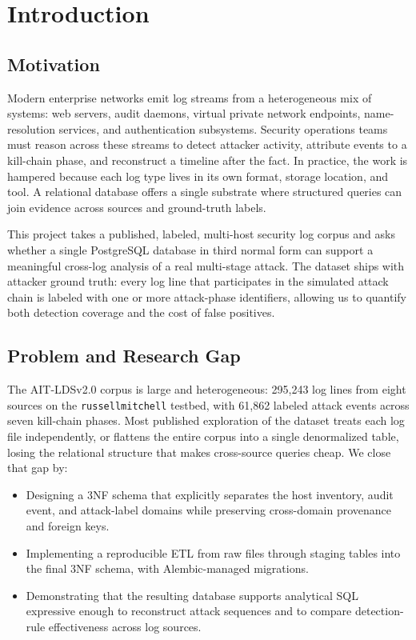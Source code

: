 \section{Introduction}
\label{sec:introduction}

\subsection{Motivation}
Modern enterprise networks emit log streams from a heterogeneous mix of
systems: web servers, audit daemons, virtual private network endpoints,
name-resolution services, and authentication subsystems. Security
operations teams must reason across these streams to detect attacker
activity, attribute events to a kill-chain phase, and reconstruct a
timeline after the fact. In practice, the work is hampered because
each log type lives in its own format, storage location, and tool. A
relational database offers a single substrate where structured queries
can join evidence across sources and ground-truth labels.

This project takes a published, labeled, multi-host security log corpus
\cite{landauer2022maintainable, ait2024dataset} and asks whether a
single PostgreSQL database in third normal form can support a
meaningful cross-log analysis of a real multi-stage attack. The dataset
ships with attacker ground truth: every log line that participates in
the simulated attack chain is labeled with one or more attack-phase
identifiers, allowing us to quantify both detection coverage and the
cost of false positives.

\subsection{Problem and Research Gap}
The AIT-LDSv2.0 corpus is large and heterogeneous: 295{,}243 log lines
from eight sources on the \texttt{russellmitchell} testbed, with
61{,}862 labeled attack events across seven kill-chain phases. Most
published exploration of the dataset treats each log file
independently, or flattens the entire corpus into a single denormalized
table, losing the relational structure that makes cross-source queries
cheap. We close that gap by:
\begin{itemize}
  \item Designing a 3NF schema that explicitly separates the host
    inventory, audit event, and attack-label domains while preserving
    cross-domain provenance and foreign keys.
  \item Implementing a reproducible ETL from raw files through staging
    tables into the final 3NF schema, with Alembic-managed migrations.
  \item Demonstrating that the resulting database supports analytical
    SQL expressive enough to reconstruct attack sequences and to
    compare detection-rule effectiveness across log sources.
\end{itemize}


